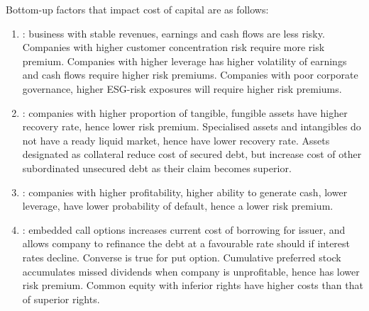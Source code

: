 \begin{remark} Bottom-up factors that impact cost of capital are as follows:
\begin{enumerate}[label=\roman*.]
\setlength{\itemsep}{0pt}
\item {}: business with stable revenues, earnings and cash flows are less risky. Companies with higher customer concentration risk require more risk premium. Companies with higher leverage has higher volatility of earnings and cash flows require higher risk premiums. Companies with poor corporate governance, higher ESG-risk exposures will require higher risk premiums.
\item {}: companies with higher proportion of tangible, fungible assets have higher recovery rate, hence lower risk premium. Specialised assets and intangibles do not have a ready liquid market, hence have lower recovery rate. Assets designated as collateral reduce cost of secured debt, but increase cost of other subordinated unsecured debt as their claim becomes superior.
\item {}: companies with higher profitability, higher ability to generate cash, lower leverage, have lower probability of default, hence a lower risk premium. 
\item {}: embedded call options increases current cost of borrowing for issuer, and allows company to refinance the debt at a favourable rate should if interest rates decline. Converse is true for put option. Cumulative preferred stock accumulates missed dividends when company is unprofitable, hence has lower risk premium. Common equity with inferior rights have higher costs than that of superior rights.
\end{enumerate}
\end{remark}

